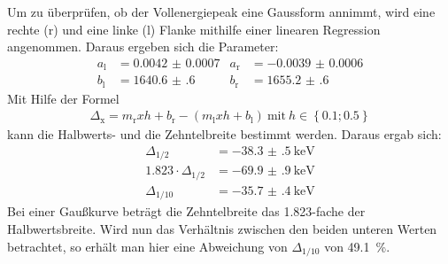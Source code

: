Um zu überprüfen, ob der Vollenergiepeak eine Gaussform annimmt, wird eine
rechte (r) und eine linke (l) Flanke mithilfe einer linearen Regression
angenommen. Daraus ergeben sich die Parameter:
\begin{align*}
	a_\text{l} &= \num{0.0042(7)} & a_\text{r} &= \num{-0.0039(6)} \\
	b_\text{l} &= \num{1640.6(6)} & b_\text{r} &= \num{1655.2(6)}
\end{align*}
Mit Hilfe der Formel
\begin{align*}
	\Delta_\text{x} = m_\text{r}xh + b_\text{r} - \left(m_\text{l}xh + b_\text{l}\right)\ \text{mit}\ h \in \left\{\num{0.1}; \num{0.5}\right\}
\end{align*}
kann die Halbwerts- und die Zehntelbreite bestimmt werden. Daraus ergab sich:
\begin{align*}
  \Delta_{1/2} &= \SI{-38.3(5)}{\kilo\electronvolt} \\
	\num{1.823} \cdot \Delta_{1/2} &= \SI{-69.9(9)}{\kilo\electronvolt} \\
  \Delta_{1/10} &= \SI{-35.7(4)}{\kilo\electronvolt}
\end{align*}
Bei einer Gaußkurve beträgt die Zehntelbreite das \num{1.823}-fache der
Halbwertsbreite.
Wird nun das Verhältnis zwischen den beiden unteren Werten
betrachtet, so erhält man hier eine Abweichung von
$\Delta_{1/10}$ von \SI{49.1}{\percent}.

